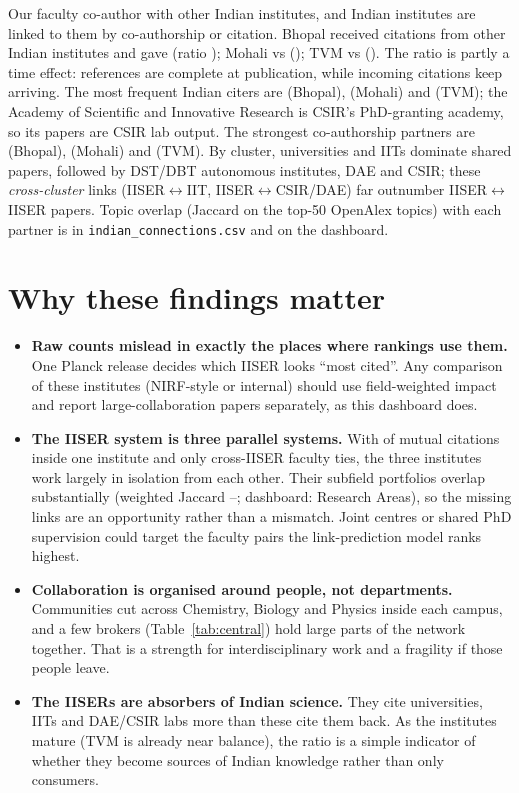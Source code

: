 \documentclass[10pt,a4paper]{article}
\begin{document}
Our faculty co-author with \Partners{} other Indian institutes, and \Linked{} Indian institutes are linked to them by co-authorship or citation. Bhopal received \InB{} citations from other Indian institutes and gave \OutB{} (ratio \RatioB); Mohali \InM{} vs \OutM{} (\RatioM); TVM \InT{} vs \OutT{} (\RatioT). The ratio is partly a time effect: references are complete at publication, while incoming citations keep arriving. The most frequent Indian citers are \TopCiterB{} (Bhopal), \TopCiterM{} (Mohali) and \TopCiterT{} (TVM); the Academy of Scientific and Innovative Research is CSIR's PhD-granting academy, so its papers are CSIR lab output. The strongest co-authorship partners are \TopPartnerB{} (Bhopal), \TopPartnerM{} (Mohali) and \TopPartnerT{} (TVM). By cluster, universities and IITs dominate shared papers, followed by DST/DBT autonomous institutes, DAE and CSIR; these \emph{cross-cluster} links (IISER$\leftrightarrow$IIT, IISER$\leftrightarrow$CSIR/DAE) far outnumber IISER$\leftrightarrow$IISER papers. Topic overlap (Jaccard on the top-50 OpenAlex topics) with each partner is in \texttt{indian\_connections.csv} and on the dashboard.

\section{Why these findings matter}
\begin{itemize}
\item \textbf{Raw counts mislead in exactly the places where rankings use them.} One Planck release decides which IISER looks ``most cited''. Any comparison of these institutes (NIRF-style or internal) should use field-weighted impact and report large-collaboration papers separately, as this dashboard does.
\item \textbf{The IISER system is three parallel systems.} With \CSelf{} of mutual citations inside one institute and only \ACross{} cross-IISER faculty ties, the three institutes work largely in isolation from each other. Their subfield portfolios overlap substantially (weighted Jaccard \SimLo--\SimHi; dashboard: Research Areas), so the missing links are an opportunity rather than a mismatch. Joint centres or shared PhD supervision could target the faculty pairs the link-prediction model ranks highest.
\item \textbf{Collaboration is organised around people, not departments.} Communities cut across Chemistry, Biology and Physics inside each campus, and a few brokers (Table~\ref{tab:central}) hold large parts of the network together. That is a strength for interdisciplinary work and a fragility if those people leave.
\item \textbf{The IISERs are absorbers of Indian science.} They cite universities, IITs and DAE/CSIR labs more than these cite them back. As the institutes mature (TVM is already near balance), the ratio is a simple indicator of whether they become sources of Indian knowledge rather than only consumers.
\end{itemize}
\end{document}
